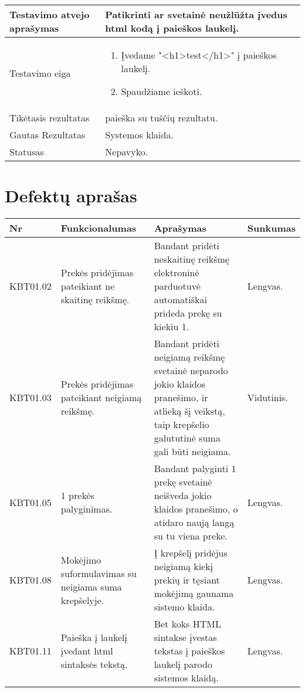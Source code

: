 \documentclass{VUMIFPSkursinis}
\begin{document}
\begin{center}
\begin{tabular}{ |p{5cm}|p{10cm}|}
	Testavimo atvejo aprašymas & Patikrinti ar svetainė neužlūžta įvedus html kodą į paieškos laukelį. \\ \hline
	Testavimo eiga & 
	\begin{enumerate}
	\item Įvedame "<h1>test</h1>" į paieškos laukelį.
	\item Spaudžiame ieškoti.
	\end{enumerate} \\ \hline
	Tikėtasis rezultatas & paieška su tuščių rezultatu. \\ \hline
	Gautas Rezultatas & Systemos klaida. \\ \hline
	Statusas & Nepavyko. \\ \hline
	\end{tabular}
\vspace{1cm}
\end{center}
\newpage
\section{Defektų aprašas}
\begin{center}
\begin{tabular}{ |p{1.8cm}| p{4cm} | p{7cm} | p{2cm} |}
	\hline
	Nr &  Funkcionalumas & Aprašymas & Sunkumas \\ \hline
	KBT01.02 & Prekės pridėjimas pateikiant ne skaitinę reikšmę. & Bandant pridėti neskaitinę reikšmę elektroninė parduotuvė automatiškai prideda prekę su kiekiu 1. & Lengvas. \\ \hline
	KBT01.03 & Prekės pridėjimas pateikiant neigiamą reikšmę. & Bandant pridėti neigiamą reikšmę svetainė neparodo jokio klaidos pranešimo, ir atlieką šį veikstą, taip krepšelio galututinė suma gali būti neigiama. & Vidutinis. \\ \hline
	KBT01.05 & 1 prekės palyginimas. & Bandant palyginti 1 prekę svetainė neišveda jokio klaidos pranešimo, o atidaro naują langą su tu viena preke. & Lengvas. \\ \hline
	KBT01.08 & Mokėjimo suformulavimas su neigiama suma krepšelyje. & Į krepšelį pridėjus neigiamą kiekį prekių ir tęsiant mokėjimą gaunama sistemo klaida. & Lengvas. \\ \hline
	KBT01.11 & Paieška į laukelį įvedant html sintaksės tekstą. & Bet koks HTML sintakse įvestas tekstas į paieškos laukelį parodo sistemos klaidą. & Lengvas. \\ \hline
\end{tabular}
\end{center}
\end{document}
